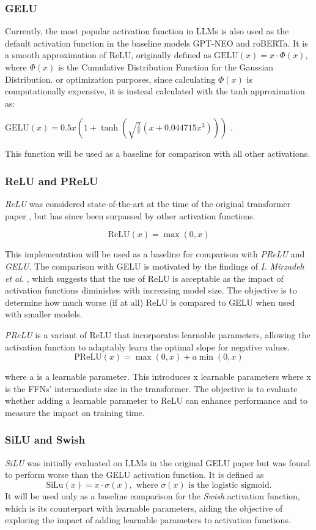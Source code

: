 \subsubsection{GELU}
Currently, the most popular activation function in LLMs is also used as the default activation function in the baseline models GPT-NEO and roBERTa. It is a smooth approximation of ReLU, originally defined as \(\text{GELU}(x) = x \cdot \Phi(x)\), where \(\Phi(x)\)
is the Cumulative Distribution Function for the Gaussian Distribution. or optimization purposes, since calculating \(\Phi(x)\) is computationally expensive, it is instead calculated with the tanh approximation as:

\(\text{GELU}(x) = 0.5x \left(1 + \tanh\left(\sqrt{\frac{2}{\pi}} \left(x + 0.044715x^3\right)\right)\right)\) \cite{Hendrycks2023}. 

This function will be used as a baseline for comparison with all other activations.

\subsubsection{ReLU and PReLU}
\textit{ReLU} was considered state-of-the-art at the time of the original transformer paper \cite{Vaswani2017}, but has since been surpassed by other activation functions.

\[
\text{ReLU}(x) = \max(0, x)
\]

This implementation will be used as a baseline for comparison with \textit{PReLU} and \textit{GELU}. The comparison with GELU is motivated by the findings of \textit{I. Mirzadeh et al.} \cite{Mirzadeh2023}, which suggests that the use of ReLU is acceptable as the impact of activation functions diminishes with increasing model size. The objective is to determine how much worse (if at all) ReLU is compared to GELU when used with smaller models.

\textit{PReLU} is a variant of ReLU that incorporates learnable parameters, allowing the activation function to adaptably learn the optimal slope for negative values.
\[
\text{PReLU}(x) = \max(0, x) + a \min(0, x)
\]

where a is a learnable parameter. This introduces x learnable parameters where x is the FFNs’ intermediate size in the transformer. The objective is to evaluate whether adding a learnable parameter to ReLU can enhance performance and to measure the impact on training time.

\subsubsection{SiLU and Swish}
\textit{SiLU} was initially evaluated on LLMs in the original GELU paper \cite{Hendrycks2023} but was found to perform worse than the GELU activation function. It is defined as 
\[
\text{SiLu}(x) = x \cdot \sigma(x), \text{ where } \sigma(x) \text{ is the logistic sigmoid.}
\]
It will be used only as a baseline comparison for the \textit{Swish} activation function, which is its counterpart with learnable parameters, aiding the objective of exploring the impact of adding learnable parameters to activation functions. 

